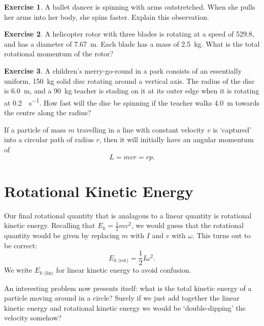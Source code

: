 \documentclass[a4paper]{amsbook}
\newcommand{\marginsymbol}{}
\newcommand{\ekl}{E_{k \text{ (lin)}}}
\newcommand{\ekr}{E_{k \text{ (rot)}}}
\theoremstyle{definition}
\newtheorem{exercise}{Exercise}
\numberwithin{exercise}{chapter}
\numberwithin{exercise}{chapter}
\begin{document}
\begin{exercise}
  A ballet dancer is spinning with arms outstretched. When she pulls her arms into her body, she spins faster.
  Explain this observation.
\end{exercise}

\begin{exercise}
  A helicopter rotor with three blades is rotating at a speed of \SI{529.8}{\rpm}, and has a diameter
  of \SI{7.67}{\metre}. Each blade has a mass of \SI{2.5}{\kilo\gram}. What is the total rotational momentum of the rotor?
\end{exercise}

\begin{exercise}
  A children's merry-go-round in a park consists of an essentially uniform, \SI{150}{\kilo\gram} solid disc rotating around
  a vertical axis. The radius of the disc is \SI{6.0}{\metre}, and a \SI{90}{\kilo\gram} teacher is stading on it at its
  outer edge when it is rotating at \SI{0.2}{\revolution\per\second}. How fast will the disc be spinning if the teacher walks \SI{4.0}{\metre}
  towards the centre along the radius?
\end{exercise}

If a particle of mass $ m $ travelling in a line with constant velocity $ v $ is `captured' into a circular path of radius $ r $,
then it will initially have an angular momentum of
\begin{equation}
  L = mvr = rp.
\end{equation}

\section{Rotational Kinetic Energy}
Our final rotational quantity that is analagous to a linear quantity is rotational kinetic energy. Recalling that $ E_k = \frac{1}{2} mv^2 $,
we would guess that the rotational quantity would be given by replacing $ m $ with $ I $ and $ v $ with $ \omega $. This turns out to be
correct:
\begin{equation}
  \ekr = \frac{1}{2} I \omega^2.
\end{equation}
We write $ \ekl $ for linear kinetic energy to avoid confusion.

\marginsymbol An interesting problem now presents itself: what is the total kinetic energy of a particle moving around in a circle? Surely if
we just add together the linear kinetic energy and rotational kinetic energy we would be `double-dipping' the velocity somehow?
\end{document}
